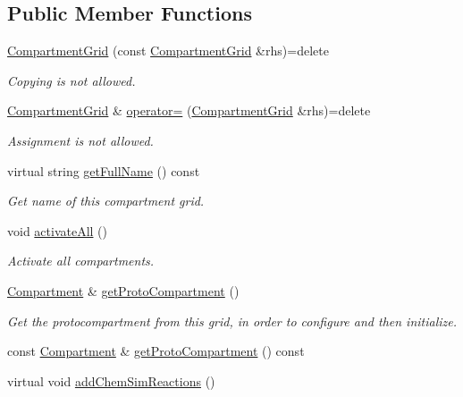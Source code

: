 \subsection*{Public Member Functions}
\begin{DoxyCompactItemize}
\item 
\hyperlink{classCompartmentGrid_a45639e5970a031560bf33cd79d46879f}{Compartment\+Grid} (const \hyperlink{classCompartmentGrid}{Compartment\+Grid} \&rhs)=delete
\begin{DoxyCompactList}\small\item\em Copying is not allowed. \end{DoxyCompactList}\item 
\hyperlink{classCompartmentGrid}{Compartment\+Grid} \& \hyperlink{classCompartmentGrid_a15d98f70f2efa2a7b7c941e0d37b98a9}{operator=} (\hyperlink{classCompartmentGrid}{Compartment\+Grid} \&rhs)=delete
\begin{DoxyCompactList}\small\item\em Assignment is not allowed. \end{DoxyCompactList}\item 
virtual string \hyperlink{classCompartmentGrid_ae388f0cfd0d78d0ebbe0583bc3d9ec41}{get\+Full\+Name} () const 
\begin{DoxyCompactList}\small\item\em Get name of this compartment grid. \end{DoxyCompactList}\item 
void \hyperlink{classCompartmentGrid_ae67feded7f744f25a1f8a2e621bb4dbd}{activate\+All} ()
\begin{DoxyCompactList}\small\item\em Activate all compartments. \end{DoxyCompactList}\item 
\hyperlink{classCompartment}{Compartment} \& \hyperlink{classCompartmentGrid_a3d698dcd594e8371254dbb38f788981d}{get\+Proto\+Compartment} ()
\begin{DoxyCompactList}\small\item\em Get the protocompartment from this grid, in order to configure and then initialize. \end{DoxyCompactList}\item 
const \hyperlink{classCompartment}{Compartment} \& \hyperlink{classCompartmentGrid_a3d2352ea05bb80d7cf21a2b112d6d500}{get\+Proto\+Compartment} () const 
\item 
virtual void \hyperlink{classCompartmentGrid_a7d6e0022747144fc6ce24ec667ea7638}{add\+Chem\+Sim\+Reactions} ()

\end{DoxyCompactItemize}
